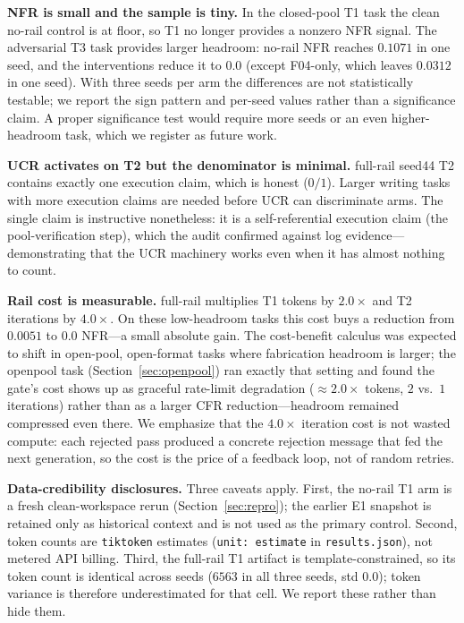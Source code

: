\documentclass[10pt,twocolumn]{article}
\begin{document}
\textbf{NFR is small and the sample is tiny.} In the closed-pool T1 task the clean no-rail control is at floor, so T1 no longer provides a nonzero NFR signal. The adversarial T3 task provides larger headroom: no-rail NFR reaches $0.1071$ in one seed, and the interventions reduce it to $0.0$ (except F04-only, which leaves $0.0312$ in one seed). With three seeds per arm the differences are not statistically testable; we report the sign pattern and per-seed values rather than a significance claim. A proper significance test would require more seeds or an even higher-headroom task, which we register as future work.

\textbf{UCR activates on T2 but the denominator is minimal.} full-rail seed44 T2 contains exactly one execution claim, which is honest ($0/1$). Larger writing tasks with more execution claims are needed before UCR can discriminate arms. The single claim is instructive nonetheless: it is a self-referential execution claim (the pool-verification step), which the audit confirmed against log evidence---demonstrating that the UCR machinery works even when it has almost nothing to count.

\textbf{Rail cost is measurable.} full-rail multiplies T1 tokens by $2.0\times$ and T2 iterations by $4.0\times$. On these low-headroom tasks this cost buys a reduction from $0.0051$ to $0.0$ NFR---a small absolute gain. The cost-benefit calculus was expected to shift in open-pool, open-format tasks where fabrication headroom is larger; the openpool task (Section~\ref{sec:openpool}) ran exactly that setting and found the gate's cost shows up as graceful rate-limit degradation ($\approx 2.0\times$ tokens, $2$ vs.\ $1$ iterations) rather than as a larger CFR reduction---headroom remained compressed even there. We emphasize that the $4.0\times$ iteration cost is not wasted compute: each rejected pass produced a concrete rejection message that fed the next generation, so the cost is the price of a feedback loop, not of random retries.

\textbf{Data-credibility disclosures.} Three caveats apply. First, the no-rail T1 arm is a fresh clean-workspace rerun (Section~\ref{sec:repro}); the earlier E1 snapshot is retained only as historical context and is not used as the primary control. Second, token counts are \texttt{tiktoken} estimates (\texttt{unit: estimate} in \texttt{results.json}), not metered API billing. Third, the full-rail T1 artifact is template-constrained, so its token count is identical across seeds ($6563$ in all three seeds, std $0.0$); token variance is therefore underestimated for that cell. We report these rather than hide them.
\end{document}
